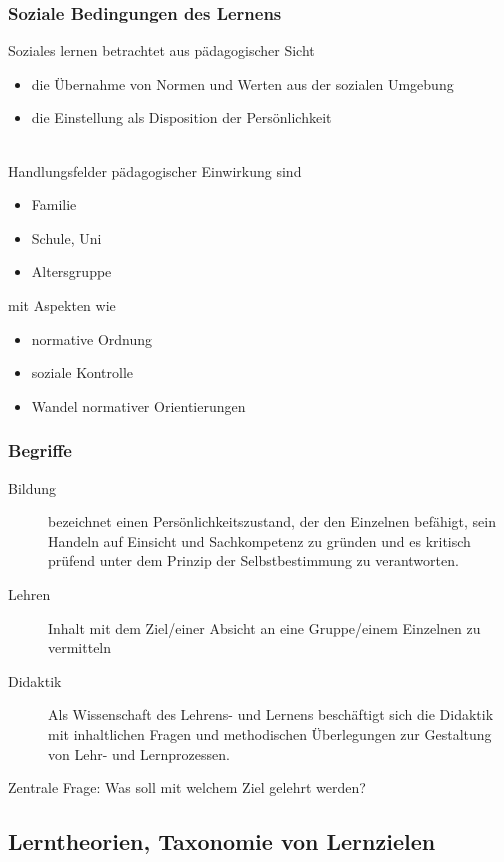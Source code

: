 \documentclass[a4paper]{article}
\begin{document}
\subsubsection{Soziale Bedingungen des Lernens}
Soziales lernen betrachtet aus pädagogischer Sicht
\begin{itemize}
	\item die Übernahme von Normen und Werten aus der sozialen Umgebung
	\item die Einstellung als Disposition der Persönlichkeit
\end{itemize}
~\\
Handlungsfelder pädagogischer Einwirkung sind
\begin{itemize}
	\item Familie
	\item Schule, Uni
	\item Altersgruppe
\end{itemize}
mit Aspekten wie
\begin{itemize}
	\item normative Ordnung
	\item soziale Kontrolle
	\item Wandel normativer Orientierungen
\end{itemize}

\subsubsection{Begriffe}
\begin{description}
	\item[Bildung] bezeichnet einen Persönlichkeitszustand, der den Einzelnen befähigt, sein Handeln auf Einsicht und Sachkompetenz zu gründen und es kritisch prüfend unter dem Prinzip der
	Selbstbestimmung zu verantworten.
	\item[Lehren] Inhalt mit dem Ziel/einer Absicht an eine Gruppe/einem Einzelnen zu vermitteln
	\item[Didaktik] Als Wissenschaft des Lehrens- und Lernens beschäftigt sich die Didaktik mit inhaltlichen Fragen und methodischen Überlegungen zur Gestaltung von Lehr- und
	Lernprozessen. 
\end{description}

Zentrale Frage: Was soll mit welchem Ziel gelehrt werden?

\subsection{Lerntheorien, Taxonomie von Lernzielen}
\end{document}
